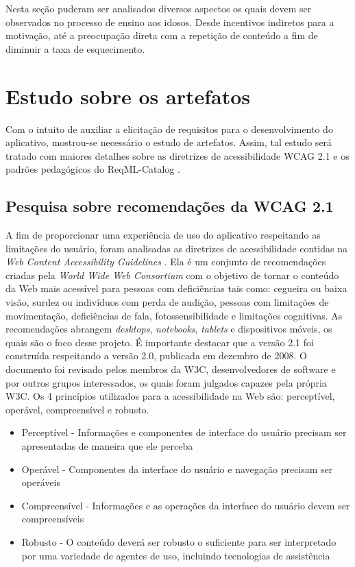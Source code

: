 Nesta seção puderam ser analisados diversos aspectos os quais devem ser observados no processo de ensino aos idosos. Desde incentivos indiretos para a motivação, até a preocupação direta com a repetição de conteúdo a fim de diminuir a taxa de esquecimento. 

\section{Estudo sobre os artefatos}
Com o intuito de auxiliar a elicitação de requisitos para o desenvolvimento do aplicativo, mostrou-se necessário o estudo de artefatos.
Assim, tal estudo será tratado com maiores detalhes sobre as diretrizes de acessibilidade WCAG 2.1 e os padrões pedagógicos do ReqML-Catalog \citep{soad2017reqml}.

\subsection{Pesquisa sobre recomendações da WCAG 2.1}
A fim de proporcionar uma experiência de uso do aplicativo respeitando as limitações do usuário, foram analisadas as diretrizes de acessibilidade contidas na \textit{Web Content Accessibility Guidelines} \citep{wcag}. Ela é um conjunto de recomendações criadas pela
\textit{World Wide Web Consortium} \citep{w3c} com o objetivo de tornar o conteúdo da Web mais acessível para pessoas com deficiências tais como: cegueira ou baixa visão, surdez ou indivíduos com perda de audição, pessoas com limitações de movimentação, deficiências de fala, fotossensibilidade e limitações cognitivas. As recomendações abrangem \textit{desktops}, \textit{notebooks}, \textit{tablets} e dispositivos móveis, os quais são o foco desse projeto. É importante destacar que a versão 2.1 foi construída respeitando a versão 2.0, publicada em dezembro de 2008. O documento foi revisado pelos membros da W3C, desenvolvedores de software e por outros grupos interessados, os quais foram julgados capazes pela própria W3C. Os 4 princípios utilizados para a acessibilidade na Web são: perceptível, operável, compreensível e robusto.
\begin{itemize}
    \item Perceptível - Informações e componentes de interface do usuário precisam ser apresentadas de maneira que ele perceba
    \item Operável - Componentes da interface do usuário e navegação precisam ser operáveis
    \item Compreensível - Informações e as operações da interface do usuário devem ser compreensíveis
    \item Robusto - O conteúdo deverá ser robusto o suficiente para ser interpretado por uma variedade de agentes de uso, incluindo tecnologias de assistência
\end{itemize}

